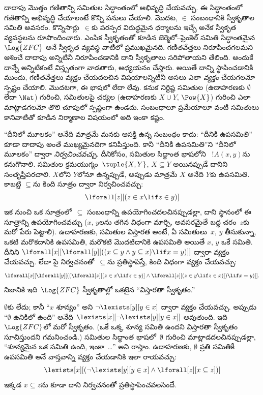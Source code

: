 \documentclass[../../../include/open-logic-section]{subfiles}
\begin{document}


దాదాపు మొత్తం గణితాన్ని సమితుల సిద్ధాంతంలో అభివృద్ధి చేయవచ్చు. ఈ
సిద్ధాంతంలో గణితాన్ని అభివృద్ధి చేయాలంటే కొన్ని పనులు చేయాలి. మొదట,
$\in$ సంబంధానికి స్వీకృతాల సమితి అవసరం. కొన్నిసార్లు~$\in$కు పరస్పర
విరుద్ధమైన ధర్మాలను ఇచ్చే అనేక స్వీకృత వ్యవస్థలను రూపొందించారు.
ఎంపిక స్వీకృతంతో కూడిన జెర్మెలో--ఫ్రెంకెల్ సమితి సిద్ధాంతమైన
$\Log{ZFC}$ అనే స్వీకృత వ్యవస్థ వాటిలో ప్రముఖమైనది. గణితవేత్తలు
నిరూపించగలమని ఆశించే దాదాపు అన్నిటినీ నిరూపించడానికి దాని స్వీకృతాలు
సరిపోతాయని తేలింది. అందుకే దాన్నే అన్నిటికంటే విస్తృతంగా వాడతారు, అధ్యయనం
చేస్తారు. అయితే దాన్ని స్థాపించడానికి ముందు, గణితవేత్తలు వ్యక్తం
చేయదలచిన విషయాలన్నిటినీ అసలు ఎలా \emph{వ్యక్తం} చేయగలమో స్పష్టం
చేయాలి. మొదటగా, ఈ భాషలో  లేదా  లేవు. కనుక
నిర్దిష్ట సమితుల (ఉదాహరణకు $\emptyset$ లేదా $\Nat$) గురించి, సమితులపై
చర్యల (ఉదాహరణకు $X \cup Y$, $\Pow{X}$) గురించి ఎలా మాట్లాడగలమో తొలి
చూపులో స్పష్టంగా ఉండదు. సంబంధాలూ ప్రమేయాలూ వంటి సమితులు కానివాటితో
కూడిన నిర్మాణాల విషయంలో అది ఇంకా కష్టం.

``దీనిలో మూలకం'' అనేది మాత్రమే మనకు ఆసక్తి ఉన్న సంబంధం కాదు:
``దీనికి ఉపసమితి'' కూడా దాదాపు అంతే ముఖ్యమైనదిగా కనిపిస్తుంది. కానీ
``దీనికి ఉపసమితి''ని ``దీనిలో మూలకం'' ద్వారా \emph{నిర్వచించవచ్చు}.
దీనికోసం, సమితుల సిద్ధాంత భాషలోని ~$!A(x,y)$ను
కనుగొనాలి. సమితుల క్రమయుగ్మం~$\tuple{X,Y}$, $X \subseteq Y$ అయినప్పుడే
దానిని సంతృప్తిపరచాలి. $X$లోని  $Y$లోనూ
 ఉన్నప్పుడే, అప్పుడు మాత్రమే $X$ అనేది $Y$కు ఉపసమితి. కాబట్టి
$\subseteq$ను కింది సూత్రం ద్వారా నిర్వచించవచ్చు:
\[
\lforall[z][(z \in x \lif z \in y)]
\]
ఇక నుంచి ఒక సూత్రంలో~$\subseteq$ సంబంధాన్ని ఉపయోగించదలచినప్పుడల్లా,
దాని స్థానంలో ఈ సూత్రాన్ని ఉపయోగించవచ్చు ($x$, $y$లను తగిన విధంగా
మార్చి, అవసరమైతే బద్ధ చరం~$z$కు మరో పేరు పెట్టాలి). ఉదాహరణకు, సమితుల
విస్తారత అంటే, ఏ సమితులు~$x$, $y$ తీసుకున్నా, ఒకటి మరొకదానికి ఉపసమితి, మరొకటి
మొదటిదానికి ఉపసమితి అయితే $x$, $y$ ఒకే సమితి. దీనిని
$\lforall[x][\lforall[y][((x \subseteq y \land y
    \subseteq x) \lif x = y)]]$ ద్వారా వ్యక్తం చేయవచ్చు. లేదా పై
నిర్వచనంతో~$\subseteq$ను ప్రతిస్థాపిస్తే, కింది విధంగా వ్యక్తం చేయవచ్చు:
\[
\lforall[x][\lforall[y][((\lforall[z][(z \in x \lif z \in y)] \land
    \lforall[z][(z \in y \lif z \in x)]) \lif x = y)]].
\]
నిజానికి ఇది~$\Log{ZFC}$ స్వీకృతాల్లో ఒకటైన ``విస్తారతా స్వీకృతం.''

$\emptyset$కు  లేదు; కానీ ``$x$ శూన్యం'' అని
$\lnot \lexists[y][y \in x]$ ద్వారా వ్యక్తం చేయవచ్చు. అప్పుడు
``$\emptyset$ ఉనికిలో ఉంది'' అనేది 
$\lexists[x][\lnot \lexists[y][y \in x]]$ అవుతుంది. ఇది~$\Log{ZFC}$లో
మరో స్వీకృతం. (ఒకే ఒక్క శూన్య సమితి ఉందని విస్తారతా స్వీకృతం
సూచిస్తుందని గమనించండి.) సమితుల సిద్ధాంత భాషలో~$\emptyset$ గురించి
మాట్లాడదలచినప్పుడల్లా, ``శూన్యమైన ఒక సమితి ఉంది, ఇంకా~\dots'' అని
రాస్తాం. ఉదాహరణకు, $\emptyset$ ప్రతి సమితికీ ఉపసమితి అనే వాస్తవాన్ని
వ్యక్తం చేయడానికి ఇలా రాయవచ్చు:
\[
\lexists[x][(\lnot\lexists[y][y \in x] \land \lforall[z][x \subseteq
    z])]
\]
ఇక్కడ $x \subseteq z$ను కూడా దాని నిర్వచనంతో ప్రతిస్థాపించవలసిందే.
\end{document}
